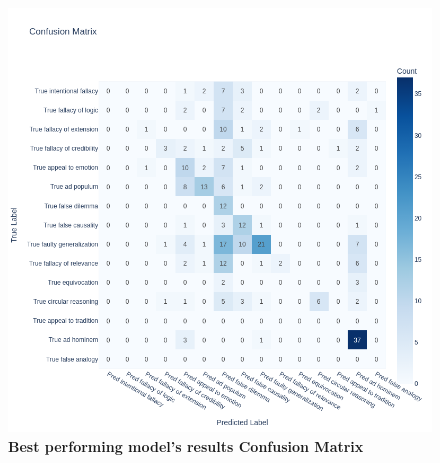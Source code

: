 \begin{figure}[H]
\centering
\includegraphics[width=\textwidth]{graphics/fine_grained_best_confusion_matrix.png}
\caption{\textbf{Best performing model's results Confusion Matrix}}
\end{figure}


